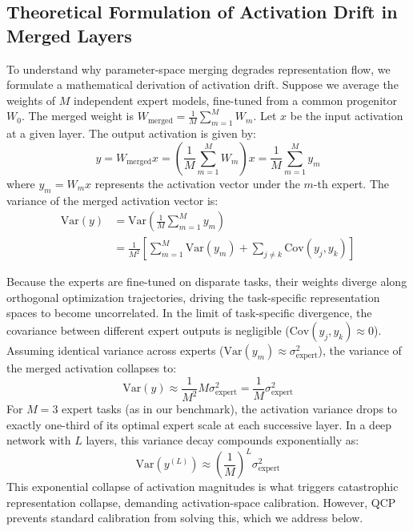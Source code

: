 \documentclass{article}
\begin{document}
\subsection{Theoretical Formulation of Activation Drift in Merged Layers}
To understand why parameter-space merging degrades representation flow, we formulate a mathematical derivation of activation drift. Suppose we average the weights of $M$ independent expert models, fine-tuned from a common progenitor $W_0$. The merged weight is $W_{\text{merged}} = \frac{1}{M} \sum_{m=1}^M W_m$. Let $x$ be the input activation at a given layer. The output activation is given by:
\begin{equation}
  y = W_{\text{merged}} x = \left( \frac{1}{M} \sum_{m=1}^M W_m \right) x = \frac{1}{M} \sum_{m=1}^M y_m
\end{equation}
where $y_m = W_m x$ represents the activation vector under the $m$-th expert.
The variance of the merged activation vector is:
\begin{align}
  \text{Var}(y) &= \text{Var}\left( \frac{1}{M} \sum_{m=1}^M y_m \right) \\
  &= \frac{1}{M^2} \left[ \sum_{m=1}^M \text{Var}(y_m) + \sum_{j \neq k} \text{Cov}(y_j, y_k) \right]
\end{align}

Because the experts are fine-tuned on disparate tasks, their weights diverge along orthogonal optimization trajectories, driving the task-specific representation spaces to become uncorrelated. In the limit of task-specific divergence, the covariance between different expert outputs is negligible ($\text{Cov}(y_j, y_k) \approx 0$). Assuming identical variance across experts ($\text{Var}(y_m) \approx \sigma^2_{\text{expert}}$), the variance of the merged activation collapses to:
\begin{equation}
  \text{Var}(y) \approx \frac{1}{M^2} M \sigma^2_{\text{expert}} = \frac{1}{M} \sigma^2_{\text{expert}}
\end{equation}
For $M=3$ expert tasks (as in our benchmark), the activation variance drops to exactly one-third of its optimal expert scale at each successive layer. In a deep network with $L$ layers, this variance decay compounds exponentially as:
\begin{equation}
  \text{Var}(y^{(L)}) \approx \left(\frac{1}{M}\right)^L \sigma^2_{\text{expert}}
\end{equation}
This exponential collapse of activation magnitudes is what triggers catastrophic representation collapse, demanding activation-space calibration. However, QCP prevents standard calibration from solving this, which we address below.
\end{document}
